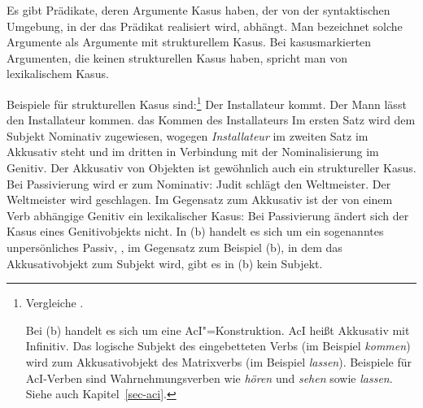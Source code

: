 Es gibt Prädikate, deren Argumente Kasus haben, der von der syntaktischen Umgebung,
in der das Prädikat realisiert wird, abhängt. Man bezeichnet solche Argumente
als Argumente mit strukturellem Kasus. Bei kasusmarkierten Argumenten,
die keinen strukturellen Kasus haben, spricht man von lexikalischem Kasus.

Beispiele für strukturellen Kasus sind:\footnote{
        Vergleiche .

        Bei (b) handelt es sich um eine AcI"=Konstruktion. AcI heißt Akkusativ mit
        Infinitiv. Das logische Subjekt des eingebetteten Verbs (im Beispiel \emph{kommen})
        wird zum Akkusativobjekt des Matrixverbs (im Beispiel \emph{lassen}).
        Beispiele für AcI-Verben sind Wahrnehmungsverben wie \emph{hören} und 
        \emph{sehen} sowie \emph{lassen}. Siehe auch Kapitel~\ref{sec-aci}.
}
\eal
\ex Der Installateur kommt.
\ex Der Mann lässt den Installateur kommen.
\ex das Kommen des Installateurs
\zl
Im ersten Satz wird dem Subjekt Nominativ zugewiesen, wogegen \emph{Installateur} im
zweiten Satz im Akkusativ steht und im dritten in Verbindung mit der Nominalisierung
im Genitiv. Der Akkusativ von Objekten ist gewöhnlich auch ein struktureller Kasus. 
Bei Passivierung wird er zum Nominativ:
\eal
\ex Judit schlägt den Weltmeister.
\ex Der Weltmeister wird geschlagen.
\zl
Im Gegensatz zum Akkusativ ist der von einem Verb abhängige Genitiv ein lexikalischer Kasus:
Bei Passivierung ändert sich der Kasus eines Genitivobjekts nicht.
\eal
{}
\zl
In (b) handelt es sich um ein sogenanntes unpersönliches Passiv,
\dash, im Gegensatz zum Beispiel (b), in dem das Akkusativobjekt zum Subjekt wird, 
gibt es in (b) kein Subjekt.

